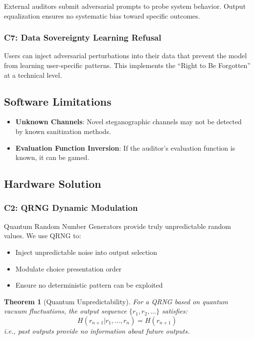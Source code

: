 \documentclass[11pt,a4paper]{article}
\newtheorem{theorem}{Theorem}
\begin{document}
External auditors submit adversarial prompts to probe system behavior.
Output equalization ensures no systematic bias toward specific outcomes.

\subsubsection{C7: Data Sovereignty Learning Refusal}

Users can inject adversarial perturbations into their data that prevent the model from learning user-specific patterns.
This implements the ``Right to Be Forgotten'' at a technical level.

\subsection{Software Limitations}

\begin{itemize}
    \item \textbf{Unknown Channels}: Novel steganographic channels may not be detected by known sanitization methods.
    \item \textbf{Evaluation Function Inversion}: If the auditor's evaluation function is known, it can be gamed.
\end{itemize}

\subsection{Hardware Solution}

\subsubsection{C2: QRNG Dynamic Modulation}

Quantum Random Number Generators provide truly unpredictable random values.
We use QRNG to:
\begin{itemize}
    \item Inject unpredictable noise into output selection
    \item Modulate choice presentation order
    \item Ensure no deterministic pattern can be exploited
\end{itemize}

\begin{theorem}[Quantum Unpredictability]
For a QRNG based on quantum vacuum fluctuations, the output sequence $\{r_1, r_2, \ldots\}$ satisfies:
\begin{equation}
H(r_{n+1} | r_1, \ldots, r_n) = H(r_{n+1})
\end{equation}
i.e., past outputs provide no information about future outputs.
\end{theorem}
\end{document}
